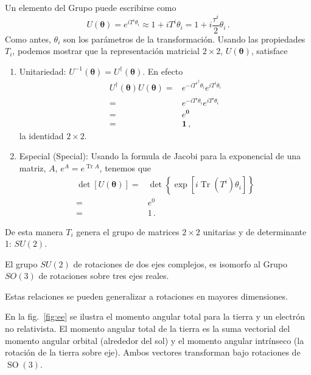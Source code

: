 \begin{frame}
Un elemento del Grupo puede escribirse como
\begin{equation}
  \label{eq:63qft}
  U(\boldsymbol{\theta})=e^{iT^i \theta_i }\approx1+iT^i\theta_i=1+i\frac{\tau^i}{2}\theta_i\,.
\end{equation}
Como antes, $\theta_i$ son los parámetros de la transformación.  Usando las propiedades $T_i$, podemos mostrar que la representación matricial $2\times 2$, $U(\boldsymbol{\theta})$, satisface
\begin{enumerate}
\item Unitariedad: $U^{-1}(\boldsymbol{\theta})=U^{\dagger}(\boldsymbol{\theta})$. En efecto
  \begin{align*}
    U^{\dagger}(\boldsymbol{\theta})U(\boldsymbol{\theta})=&e^{-i{T^i}^{\dagger} \theta_i }e^{iT^i \theta_i }\nonumber\\
=&e^{-i T^i \theta_i }e^{iT^i \theta_i } \nonumber\\
=&e^{\mathbf{0}}\nonumber\\
=&\mathbf{1}\,,
  \end{align*}
la identidad $2\times 2$.
\item Especial (Special): Usando la formula de Jacobi para la exponencial de una matriz, $A$, $e^{A}=e^{\operatorname{Tr}A}$, tenemos que
  \begin{align*}
   \det[U(\boldsymbol{\theta})]=&\det\left\{\exp\left[  i \operatorname{Tr}\left( T^i \right)\theta_i \right]  \right\}\nonumber\\
                           =&e^{0}\nonumber\\
                           =&1\,.
  \end{align*}
\end{enumerate}
De esta manera $T_i$ genera el grupo de matrices $2\times 2$ unitarias y de determinante 1: $SU(2)$. 
\end{frame}

El grupo $SU(2)$ de rotaciones de dos ejes complejos, es isomorfo al Grupo $SO(3)$ de rotaciones sobre tres ejes reales.

Estas relaciones se pueden generalizar a rotaciones en mayores dimensiones.

En la fig.~\ref{fig:ee} se ilustra el momento angular total para la tierra y un electrón no relativista. El momento angular total de la tierra es la suma vectorial del momento angular orbital (alrededor del sol) y el momento angular intrínseco (la rotación de la tierra sobre eje). Ambos vectores transforman bajo rotaciones de $\operatorname{SO}(3)$.

